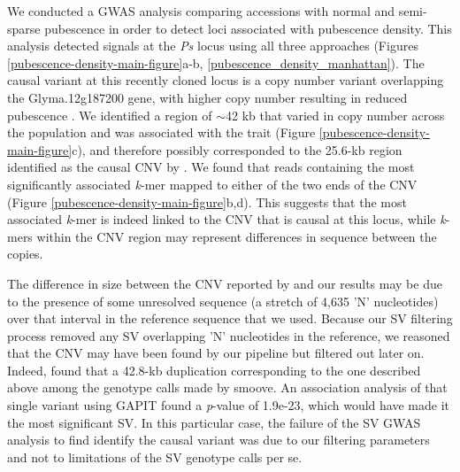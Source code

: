 We conducted a GWAS analysis comparing accessions with normal and semi-sparse
pubes\-cence in order to detect loci associated with pubescence density. This analysis
detected signals at the \textit{Ps} locus using all three approaches (Figures
\ref{pubescence-density-main-figure}a-b, \ref{pubescence_density_manhattan}). The causal
variant at this recently cloned locus is a copy number variant overlapping the
Glyma.12g187200 gene, with higher copy number resulting in reduced pubescence \citep{liu2020ps}.
We identified a region of $\sim$42 kb that varied in copy number across
the population and was associated with the trait (Figure
\ref{pubescence-density-main-figure}c), and therefore possibly corresponded to the
25.6-kb region identified as the causal CNV by \cite{liu2020ps}. We found that
reads containing the most significantly associated \textit{k}-mer mapped to either of the two ends
of the CNV (Figure \ref{pubescence-density-main-figure}b,d). This suggests that
the most associated \textit{k}-mer is indeed linked to the CNV
that is causal at this locus, while \textit{k}-mers within the
CNV region may represent differences in sequence between the copies.

The difference in size between the CNV reported by \cite{liu2020ps} and our
results may be due to the presence of some unresolved sequence (a stretch of
4,635 'N' nucleotides) over that interval in the reference sequence that we used.
Because our SV filtering process removed any SV overlapping 'N' nucleotides in
the reference, we reasoned that the CNV may have been found by our pipeline but
filtered out later on. Indeed, found that a 42.8-kb duplication corresponding
to the one described above among the genotype calls made by smoove. An association
analysis of that single variant using GAPIT found a \textit{p}-value of 1.9e-23,
which would have made it the most significant SV. In this particular case, the
failure of the SV GWAS analysis to find identify the causal variant was due
to our filtering parameters and not to limitations of the SV genotype calls per se.

